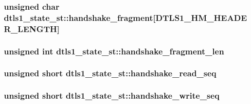 \subsubsection[{\texorpdfstring{handshake\+\_\+fragment}{handshake_fragment}}]{\setlength{\rightskip}{0pt plus 5cm}unsigned char dtls1\+\_\+state\+\_\+st\+::handshake\+\_\+fragment\mbox{[}{\bf D\+T\+L\+S1\+\_\+\+H\+M\+\_\+\+H\+E\+A\+D\+E\+R\+\_\+\+L\+E\+N\+G\+TH}\mbox{]}}\hypertarget{structdtls1__state__st_a1fca455e80d0a3036c79d9209ac51633}{}\label{structdtls1__state__st_a1fca455e80d0a3036c79d9209ac51633}
\subsubsection[{\texorpdfstring{handshake\+\_\+fragment\+\_\+len}{handshake_fragment_len}}]{\setlength{\rightskip}{0pt plus 5cm}unsigned int dtls1\+\_\+state\+\_\+st\+::handshake\+\_\+fragment\+\_\+len}\hypertarget{structdtls1__state__st_abeb5303866e89417b37551332cf28f08}{}\label{structdtls1__state__st_abeb5303866e89417b37551332cf28f08}
\subsubsection[{\texorpdfstring{handshake\+\_\+read\+\_\+seq}{handshake_read_seq}}]{\setlength{\rightskip}{0pt plus 5cm}unsigned short dtls1\+\_\+state\+\_\+st\+::handshake\+\_\+read\+\_\+seq}\hypertarget{structdtls1__state__st_a928b4ab02c52ca660cb46762133b21bb}{}\label{structdtls1__state__st_a928b4ab02c52ca660cb46762133b21bb}
\subsubsection[{\texorpdfstring{handshake\+\_\+write\+\_\+seq}{handshake_write_seq}}]{\setlength{\rightskip}{0pt plus 5cm}unsigned short dtls1\+\_\+state\+\_\+st\+::handshake\+\_\+write\+\_\+seq}\hypertarget{structdtls1__state__st_ac14d838ba2fa596ab378ac07bee6e0c8}{}\label{structdtls1__state__st_ac14d838ba2fa596ab378ac07bee6e0c8}
